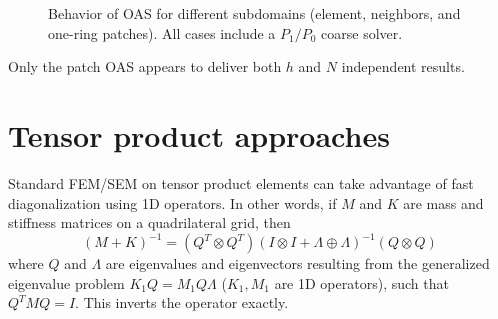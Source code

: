 \documentclass{article}
\begin{document}
\begin{figure}
\centering
{}
\caption{Behavior of OAS for different subdomains (element, neighbors, and one-ring patches).  All cases include a $P_1/P_0$ coarse solver.}
\end{figure}

Only the patch OAS appears to deliver both $h$ and $N$ independent results.  

\section{Tensor product approaches}

Standard FEM/SEM on tensor product elements can take advantage of fast diagonalization using 1D operators.  In other words, if $M$ and $K$ are mass and stiffness matrices on a quadrilateral grid, then
\[
(M + K)^{-1} = (Q^T \otimes Q^T) (I\otimes I + \Lambda \oplus \Lambda)^{-1} (Q\otimes Q)
\]
where $Q$ and $\Lambda$ are eigenvalues and eigenvectors resulting from the generalized eigenvalue problem $K_1Q = M_1Q \Lambda$ ($K_1, M_1$ are 1D operators), such that $Q^TMQ = I$.  This inverts the operator exactly.  
\end{document}
